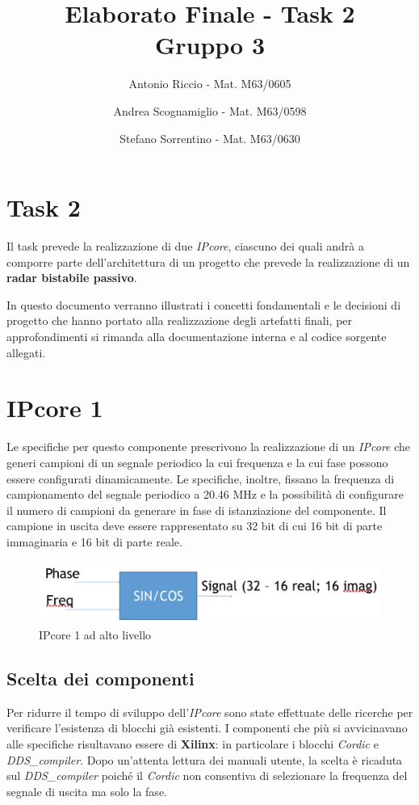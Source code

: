 \documentclass[12pt,a4paper,twoside,openany]{book}
\author{Antonio Riccio - Mat. M63/0605
\and Andrea Scognamiglio - Mat. M63/0598
\and Stefano Sorrentino - Mat. M63/0630}
\title{Elaborato Finale - Task 2 \\ Gruppo 3}
\begin{document}
\frontmatter
\maketitle
\tableofcontents
\setcounter{page}{1}
\mainmatter
\chapter*{Task 2}
Il task prevede la realizzazione di due \textit{IPcore}, ciascuno dei quali andrà a comporre parte dell'architettura di un progetto che prevede la realizzazione di un \textbf{radar bistabile passivo}. 

In questo documento verranno illustrati i concetti fondamentali e le decisioni di progetto che hanno portato alla realizzazione degli artefatti finali, per approfondimenti si rimanda alla documentazione interna e al codice sorgente allegati. 

\chapter{IPcore 1}
Le specifiche per questo componente prescrivono la realizzazione di un \textit{IPcore} che generi campioni di un segnale periodico la cui frequenza e la cui fase possono essere configurati dinamicamente. Le specifiche, inoltre, fissano la frequenza di campionamento del segnale periodico a 20.46 MHz e la possibilità di configurare il numero di campioni da generare in fase di istanziazione del componente. Il campione in uscita deve essere rappresentato su 32 bit di cui 16 bit di parte immaginaria e 16 bit di parte reale.

\begin{figure}[h]
\begin{center}
\includegraphics[scale=0.6, keepaspectratio]{immagini/ipcore1_toplevel}
\caption{IPcore 1 ad alto livello}
\label{ipcore1_top}
\end{center}
\end{figure}

\section{Scelta dei componenti}
Per ridurre il tempo di sviluppo dell'\textit{IPcore} sono state effettuate delle ricerche per verificare l'esistenza di blocchi già esistenti. I componenti che più si avvicinavano alle specifiche risultavano essere di \textbf{Xilinx}: in particolare i blocchi \textit{Cordic} e \textit{DDS\_compiler}. Dopo un'attenta lettura dei manuali utente, la scelta è ricaduta sul \textit{DDS\_compiler} poiché il \textit{Cordic} non consentiva di selezionare la frequenza del segnale di uscita ma solo la fase.
\end{document}
